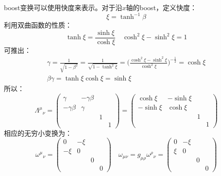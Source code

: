 \documentclass{book}
\begin{document}
boost变换可以使用快度来表示。对于沿$x$轴的boost，定义快度：
\begin{equation}
	\xi=\tanh^{-1}\beta
\end{equation}
利用双曲函数的性质：
\begin{equation}
	\tanh\xi=\frac{\sinh\xi}{\cosh\xi}\quad \cosh^2\xi-\sinh^2\xi=1
\end{equation}
可推出：
\begin{gather}
\gamma=\frac{1}{\sqrt{1-\beta^2}}=\frac{1}{\sqrt{1-\tanh^2\xi}}=\Big(\frac{\cosh^2\xi-\sinh^2\xi}{\cosh^2\xi}\Big)^{-\frac12}=\cosh\xi \\
\beta\gamma=\tanh\xi\cosh\xi=\sinh\xi
\end{gather}
所以：
\begin{equation}
	\Lambda^\mu{}_\nu=\begin{pmatrix}\gamma&-\gamma\beta&&\\-\gamma\beta&\gamma&&\\&&1&\\&&&1\end{pmatrix}=\begin{pmatrix}\cosh\xi&-\sinh\xi\\-\sinh\xi&\cosh\xi\\&&1\\&&&1\end{pmatrix}
\end{equation}
相应的无穷小变换为：
\begin{equation}
	\omega^\mu{}_\nu=\begin{pmatrix}0&-\xi&&\\-\xi&0&&\\&&0&\\&&&0\end{pmatrix}\quad \omega_{\mu\nu}=g_{\mu\rho}\omega^\rho{}_\nu=\begin{pmatrix}0&-\xi&&\\\xi&0&&\\&&0&\\&&&0\end{pmatrix}
\end{equation}
\end{document}
